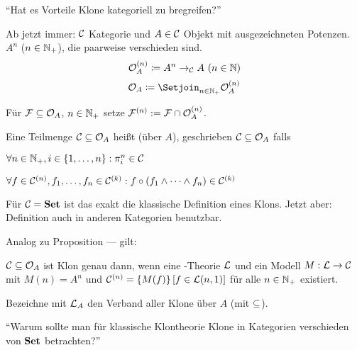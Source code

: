\documentclass{book}
\begin{document}
\newenvironment{question}{\begin{center}}{\end{center}}
\newenvironment{answer}{\begin{center}}{\end{center}}

\begin{question}
    ``Hat es Vorteile Klone kategoriell zu bregreifen?''
\end{question}

Ab jetzt immer: $\mathcal{C}$ Kategorie und $A\in\mathcal{C}$ Objekt mit ausgezeichneten Potenzen. $A^n$ ($n\in\mathbb{N}_+$), die paarweise verschieden sind.
$$
\mathcal{O}_A^{(n)} \mathrel{\mathrel{\mathop:}\mkern-1.2mu=} A^n\rightarrow_{\mathcal{C}} A\text{ ($n\in\mathbb{N}$)}
$$
$$
\cO_A \defeq \Setjoin_{n\in\nats_+}{\cO_A^{(n)}}
$$

Für $\mathcal{F}\subseteq\mathcal{O}_A$, $n\in\mathbb{N}_+$ setze $\mathcal{F}^{(n)}:=\mathcal{F}\cap\mathcal{O}^{(n)}_A$.

\begin{definition}
    Eine Teilmenge $\mathcal{C}\subseteq\mathcal{O}_A$ heißt  (über $A$), geschrieben $\mathcal{C}\subseteq\mathcal{O}_A$ falls
    \begin{statements}
            \item $\forall n\in\mathbb{N}_+,i\in\left\{1,\ldots,n\right\}:\pi_i^n\in\mathcal{C}$
        \item $\forall f\in\mathcal{C}^{(n)},f_1,\ldots,f_n\in\mathcal{C}^{(k)}:f\circ(f_1\wedge\cdots\wedge f_n)\in\mathcal{C}^{(k)}$
    \end{statements}
\end{definition}

\begin{remark}
    Für $\mathcal{C}=\mathbf{Set}$ ist das exakt die klassische Definition eines Klons. Jetzt aber: Definition auch in anderen Kategorien benutzbar.
\end{remark}

Analog zu Proposition --- gilt:

\begin{proposition}
    $\mathcal{C}\subseteq\mathcal{O}_A$ ist Klon genau dann, wenn eine -Theorie $\mathcal{L}$ und ein Modell $M:\mathcal{L}\rightarrow\mathcal{C}$ mit $M(n)=A^n$ und $\mathcal{C}^{(n)}=\left\{M(f)\right\}[f\in\mathcal{L}(n,1)]$ für alle $n\in\mathbb{N}_+$ existiert.
\end{proposition}

\begin{definition}
    Bezeichne mit $\mathcal{L}_A$ den Verband aller Klone über $A$ (mit $\subseteq$).
\end{definition}

\begin{question}
    ``Warum sollte man für klassische Klontheorie Klone in Kategorien verschieden von $\mathbf{Set}$ betrachten?''
\end{question}
\end{document}
